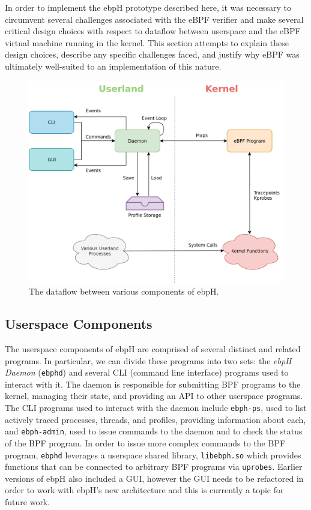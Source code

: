 \documentclass[
  12pt]{findlay}
\begin{document}
In order to implement the ebpH prototype described here, it was
necessary to circumvent several challenges associated with the eBPF
verifier and make several critical design choices with respect to
dataflow between userspace and the eBPF virtual machine running in the
kernel. This section attempts to explain these design choices, describe
any specific challenges faced, and justify why eBPF was ultimately
well-suited to an implementation of this nature.

\begin{figure}
\centering
\includegraphics[width=\textwidth,height=0.4\textheight]{../figures/ebph-dataflow.png}
\caption{\label{ebph-dataflow}The dataflow between various components of
ebpH.}
\end{figure}

\FloatBarrier

\hypertarget{userspace-components}{%
\subsection{Userspace Components}\label{userspace-components}}

The userspace components of ebpH are comprised of several distinct and
related programs. In particular, we can divide these programs into two
sets: the \emph{ebpH Daemon} (\passthrough{\lstinline!ebphd!}) and
several CLI (command line interface) programs used to interact with it.
The daemon is responsible for submitting BPF programs to the kernel,
managing their state, and providing an API to other userspace programs.
The CLI programs used to interact with the daemon include
\passthrough{\lstinline!ebph-ps!}, used to list actively traced
processes, threads, and profiles, providing information about each, and
\passthrough{\lstinline!ebph-admin!}, used to issue commands to the
daemon and to check the status of the BPF program. In order to issue
more complex commands to the BPF program,
\passthrough{\lstinline!ebphd!} leverages a userspace shared library,
\passthrough{\lstinline!libebph.so!} which provides functions that can
be connected to arbitrary BPF programs via
\passthrough{\lstinline!uprobes!}. Earlier versions of ebpH also
included a GUI, however the GUI needs to be refactored in order to work
with ebpH's new architecture and this is currently a topic for future
work.
\end{document}
